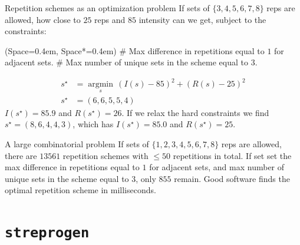 \documentclass[11pt, aspectratio=149]{beamer}
\newcommand{\listSpace}{0.4em}
\theoremstyle{plain}
\begin{document}
\begin{frame}[fragile, t]{Repetition schemes as an optimization problem}
	\vfill
	If sets of $\{3, 4, 5, 6, 7, 8 \}$ reps are allowed, how close to $25$ reps and $85$ intensity can we get, subject to the constraints:
	\vfill
	\begin{easylist}[itemize]
		\ListProperties(Space=\listSpace, Space*=\listSpace)
		# Max difference in repetitions equal to $1$ for adjacent sets.
		# Max number of unique sets in the scheme equal to $3$.
	\end{easylist}
	\begin{align*}
	s^\star &=  \underset{s}{\operatorname{argmin}} \, \left( I(s) - 85\right)^2 + \left( R(s) - 25\right)^2 \\
	s^\star &= (6, 6, 5, 5, 4)
	\end{align*}
	$I(s^\star) = 85.9$ and $R(s^\star) = 26$.
	\vfill
	If we relax the hard constraints we find $s^\star = (8, 6, 4, 4, 3)$, which has $I(s^\star) = 85.0$ and $R(s^\star) = 25$.
\end{frame}


\begin{frame}[fragile, t]{A large combinatorial problem}
	\vfill
	If sets of $\{1, 2, 3, 4, 5, 6, 7, 8 \}$ reps are allowed, there are $13561$ repetition schemes with $\leq 50$ repetitions in total.
	\vfill
	If set set the max difference in repetitions equal to $1$ for adjacent sets, and max number of unique sets in the scheme equal to $3$, only $855$ remain.
	\vfill
	Good software finds the optimal repetition scheme in milliseconds.
	\vfill
\end{frame}


\section{\texttt{streprogen}}
\end{document}

